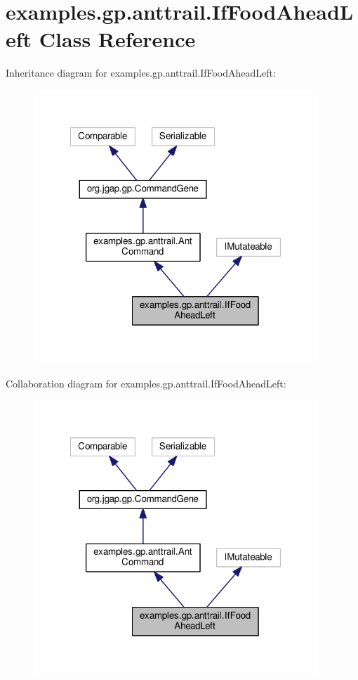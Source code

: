 \hypertarget{classexamples_1_1gp_1_1anttrail_1_1_if_food_ahead_left}{\section{examples.\-gp.\-anttrail.\-If\-Food\-Ahead\-Left Class Reference}
\label{classexamples_1_1gp_1_1anttrail_1_1_if_food_ahead_left}
}


Inheritance diagram for examples.\-gp.\-anttrail.\-If\-Food\-Ahead\-Left\-:
\nopagebreak
\begin{figure}[H]
\begin{center}
\leavevmode
\includegraphics[width=304pt]{classexamples_1_1gp_1_1anttrail_1_1_if_food_ahead_left__inherit__graph}
\end{center}
\end{figure}


Collaboration diagram for examples.\-gp.\-anttrail.\-If\-Food\-Ahead\-Left\-:
\nopagebreak
\begin{figure}[H]
\begin{center}
\leavevmode
\includegraphics[width=304pt]{classexamples_1_1gp_1_1anttrail_1_1_if_food_ahead_left__coll__graph}
\end{center}
\end{figure}
